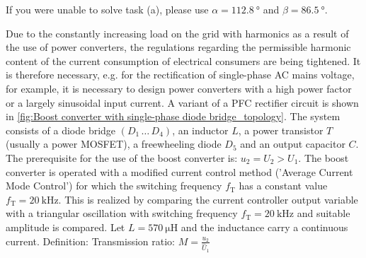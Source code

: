 \vspace{2em}\par
If you were unable to solve task (a), please use $\alpha=\SI{112.8}{\degree}$ and $\beta=\SI{86.5}{\degree}$.








Due to the constantly increasing load on the grid with harmonics as a result of the use of power converters, the regulations regarding the permissible harmonic content of the current consumption of electrical consumers are being tightened. It is therefore necessary, e.g. for the rectification of single-phase AC mains voltage, for example, it is necessary to design power converters with a high power factor or a largely sinusoidal input current. 
A variant of a PFC rectifier circuit is shown in \autoref{fig:Boost converter with single-phase diode bridge_topology}. The system consists of a diode bridge $(D_{\mathrm{1}} \, \dots \, D_{\mathrm{4}})$, an inductor $L$, a power transistor $T$ (usually a power MOSFET), a freewheeling diode $D_\mathrm{5}$ and an output capacitor $C$. The prerequisite for the use of the boost converter is: $u_\mathrm{2} = U_\mathrm{2}>U_\mathrm{1}$. The boost converter is operated with a modified current control method ('Average Current Mode Control') for which the switching frequency $f_\mathrm{T}$ has a constant value $f_\mathrm{T} = \SI{20}{\kilo\hertz}$. This is realized by comparing the current controller output variable with a triangular oscillation with switching frequency $f_\mathrm{T} = \SI{20}{\kilo\hertz}$ and suitable amplitude is compared. Let $L = \SI{570}{\micro\henry}$ and the inductance carry a continuous current. Definition: Transmission ratio: $M = \frac{u_\mathrm{2}}{\hat U_\mathrm{1}}$


